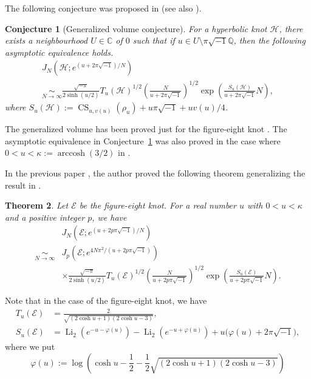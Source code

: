 \documentclass[a4paper,dvipdfmx]{amsart}
\theoremstyle{plain}
\newtheorem{thm}{Theorem}[section]
\newtheorem{conj}[thm]{Conjecture}
\theoremstyle{definition}
\theoremstyle{remark}
\newcommand{\C}{\mathbb{C}}
\newcommand{\Q}{\mathbb{Q}}
\newcommand{\CS}{\operatorname{CS}}
\newcommand{\Li}{\operatorname{Li}}
\newcommand{\Khyp}{\mathscr{H}}
\newcommand{\arccosh}{\operatorname{arccosh}}
\newcommand{\FE}{\mathscr{E}}
\renewcommand{\i}{\sqrt{-1}}
\numberwithin{equation}{section}
\begin{document}
\par
The following conjecture was proposed in \cite{Murakami:JTOP2013} (see also \cite{Gukov/Murakami:FIC2008,Dimofte/Gukov:Columbia}).
\begin{conj}[Generalized volume conjecture]\label{conj:GVC}
For a hyperbolic knot $\Khyp$, there exists a neighbourhood $U\in\C$ of $0$ such that if $u\in U\setminus\pi\i\Q$, then the following asymptotic equivalence holds.
\begin{multline*}
  J_N(\Khyp;e^{(u+2\pi\i)/N})
  \\
  \underset{N\to\infty}{\sim}
  \frac{\sqrt{-\pi}}{2\sinh(u/2)}T_{u}(\Khyp)^{1/2}
  \left(\frac{N}{u+2\pi\i}\right)^{1/2}
  \exp\left(\frac{S_{u}(\Khyp)}{u+2\pi\i}N\right),
\end{multline*}
where $S_{u}(\Khyp):=\CS_{u,v(u)}(\rho_u)+u\pi\i+uv(u)/4$.
\end{conj}
The generalized volume has been proved just for the figure-eight knot \cite{Murakami/Yokota:JREIA2007}.
The asymptotic equivalence in Conjecture~\ref{conj:GVC} was also proved in the case where $0<u<\kappa:=\arccosh(3/2)$ in \cite{Murakami:JTOP2013}.
\par
In the previous paper \cite{Murakami:CANJM2023}, the author proved the following theorem generalizing the result in \cite{Murakami:JTOP2013}.
\begin{thm}\label{thm:u_p}
Let $\FE$ be the figure-eight knot.
For a real number $u$ with $0<u<\kappa$ and a positive integer $p$, we have
\begin{equation*}
\begin{split}
  &J_N(\FE;e^{(u+2p\pi\i)/N})
  \\
  \underset{N\to\infty}{\sim}&
  J_{p}(\FE;e^{4N\pi^2/(u+2p\pi\i)})
  \\
  &\times
  \frac{\sqrt{-\pi}}{2\sinh(u/2)}T_{u}(\FE)^{1/2}
  \left(\frac{N}{u+2p\pi\i}\right)^{1/2}
  \exp\left(\frac{S_{u}(\FE)}{u+2p\pi\i}N\right).
\end{split}
\end{equation*}
\end{thm}
Note that in the case of the figure-eight knot, we have
\begin{align*}
  T_{u}(\FE)
  &=
  \frac{2}{\sqrt{(2\cosh{u}+1)(2\cosh{u}-3)}},
  \\
  S_{u}(\FE)
  &=
  \Li_2\left(e^{-u-\varphi(u)}\right)
  -
  \Li_2\left(e^{-u+\varphi(u)}\right)
  +
  u\bigl(\varphi(u)+2\pi\i\bigr),
\end{align*}
where we put
\begin{equation*}
  \varphi(u)
  :=
  \log
  \left(
    \cosh{u}-\frac{1}{2}
    -
    \frac{1}{2}\sqrt{(2\cosh{u}+1)(2\cosh{u}-3)}
  \right)
\end{equation*}
\end{document}
